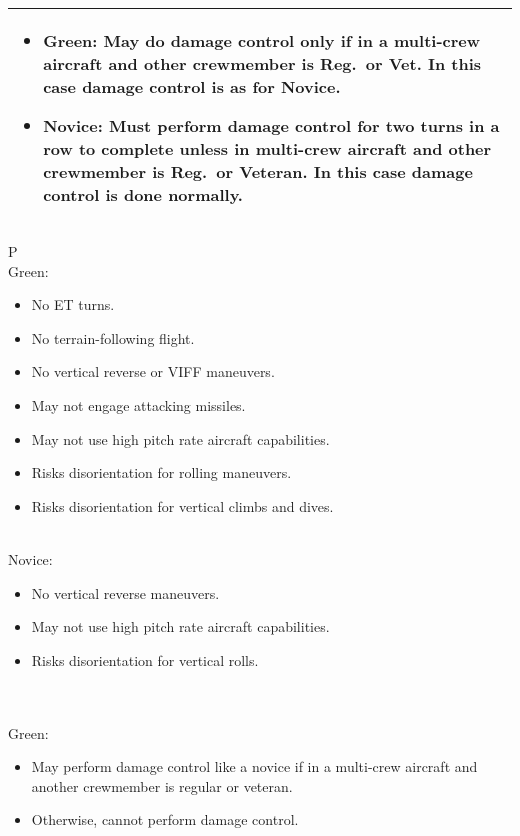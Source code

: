 \begin{onecolumntablefloat}
\begin{onecolumntable}
{\begin{tabularx}{\linewidth}{X}
\begin{itemize}
    \item Green: May do damage control only if in a multi-crew aircraft and other crewmember is Reg.\ or Vet. In this case damage control is as for Novice.
    \item Novice: Must perform damage control for two turns in a row to complete unless in multi-crew aircraft and other crewmember is Reg.\ or Veteran. In this case damage control is done normally.
\end{itemize}
\\
\bottomrule
\end{tabularx}
}{
\begin{tabularx}{\linewidth}{P}
\toprule
{}\\
\midrule
\addlinespace
Green:\\
\begin{itemize}[topsep=0pt]
\item No ET turns.
\item No terrain-following flight.
\item No vertical reverse or VIFF maneuvers.
\item May not engage attacking missiles.
\item May not use high pitch rate aircraft capabilities.
\item Risks disorientation for rolling maneuvers.
\item Risks disorientation for vertical climbs and dives.
\end{itemize}\\
Novice:\\
\begin{itemize}[topsep=0pt]
    \item No vertical reverse maneuvers.
    \item May not use high pitch rate aircraft capabilities.
    \item Risks disorientation for vertical rolls.
\end{itemize}\\
\midrule
{}\\
\midrule
\addlinespace
Green:\\
\begin{itemize}[topsep=0pt]
\item May perform damage control like a novice if in a multi-crew aircraft and another crewmember is regular or veteran.
\item Otherwise, cannot perform damage control.

\end{itemize}
\end{tabularx}}
\end{onecolumntable}
\end{onecolumntablefloat}

